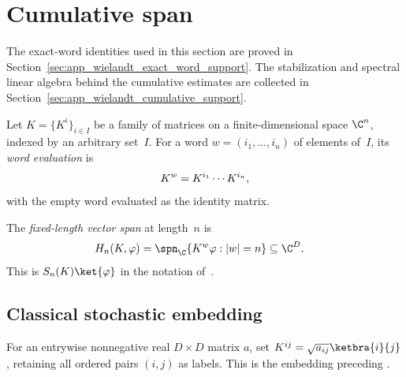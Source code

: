 \section{Cumulative span}

The exact-word identities used in this section are proved in
Section~\ref{sec:app_wielandt_exact_word_support}. The stabilization and
spectral linear algebra behind the cumulative estimates are collected in
Section~\ref{sec:app_wielandt_cumulative_support}.

\begin{definition}
    \label{def:kraus_eval_word}
    \leanok
    Let $K=\{K^i\}_{i\in I}$ be a family of matrices on a finite-dimensional
    space $\C^n$, indexed by an arbitrary set~$I$.
    For a word $w=(i_1,\ldots,i_n)$ of elements of~$I$, its \emph{word evaluation} is
    \begin{align}
        K^w=K^{i_1}\cdots K^{i_n},
        \notag
    \end{align}
    with the empty word evaluated as the identity matrix.
\end{definition}

\begin{definition}\label{def:vector_spread_span}
    \leanok
    The \emph{fixed-length vector span} at length~$n$ is
    \begin{align}
        H_n(K,\varphi)
         & =\spn_{\C}\{K^w\varphi:|w|=n\}\subseteq\C^D.
        \notag
    \end{align}
    This is $S_n(K)\ket{\varphi}$ in the notation
    of~\cite{Sanz2010Quantum}.
\end{definition}

\subsection{Classical stochastic embedding}

\begin{definition}
    \label{def:stochastic_kraus_embedding}
    \leanok
    For an entrywise nonnegative real $D\times D$ matrix $a$, set
    $K^{ij}=\sqrt{a_{ij}}\ketbra{i}{j}$, retaining all ordered pairs
    $(i,j)$ as labels. This is the embedding preceding
    \cite[Proposition~2]{Sanz2010Quantum}.
\end{definition}

